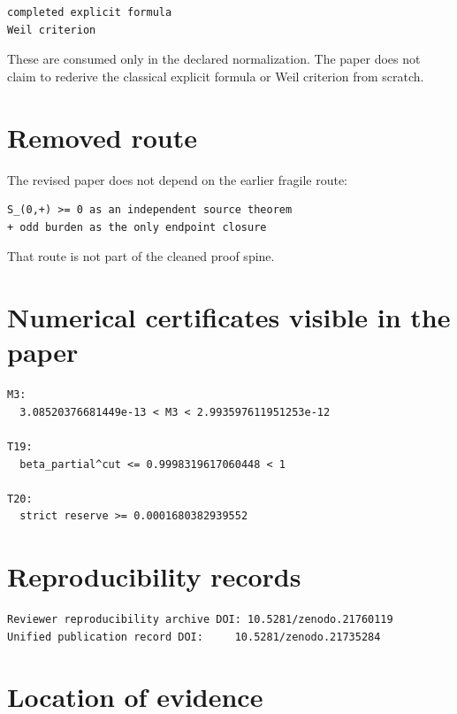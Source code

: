 \begin{verbatim}
completed explicit formula
Weil criterion
\end{verbatim}

These are consumed only in the declared normalization. The paper does not claim to rederive the classical explicit formula or Weil criterion from scratch.

\hypertarget{removed-route}{%
\section{Removed route}\label{removed-route}}

The revised paper does not depend on the earlier fragile route:

\begin{verbatim}
S_(0,+) >= 0 as an independent source theorem
+ odd burden as the only endpoint closure
\end{verbatim}

That route is not part of the cleaned proof spine.

\hypertarget{numerical-certificates-visible-in-the-paper}{%
\section{Numerical certificates visible in the paper}\label{numerical-certificates-visible-in-the-paper}}

\begin{verbatim}
M3:
  3.08520376681449e-13 < M3 < 2.993597611951253e-12

T19:
  beta_partial^cut <= 0.9998319617060448 < 1

T20:
  strict reserve >= 0.0001680382939552
\end{verbatim}

\hypertarget{reproducibility-records}{%
\section{Reproducibility records}\label{reproducibility-records}}

\begin{verbatim}
Reviewer reproducibility archive DOI: 10.5281/zenodo.21760119
Unified publication record DOI:     10.5281/zenodo.21735284
\end{verbatim}

\hypertarget{location-of-evidence}{%
\section{Location of evidence}\label{location-of-evidence}}

